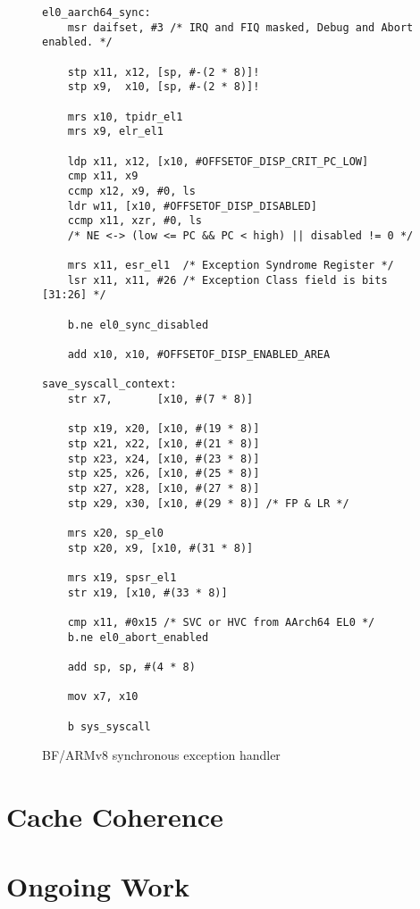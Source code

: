 \documentclass[a4paper,twoside]{report}
\begin{document}
\begin{figure}
\begin{lstlisting}
el0_aarch64_sync:
    msr daifset, #3 /* IRQ and FIQ masked, Debug and Abort enabled. */

    stp x11, x12, [sp, #-(2 * 8)]!
    stp x9,  x10, [sp, #-(2 * 8)]!

    mrs x10, tpidr_el1
    mrs x9, elr_el1

    ldp x11, x12, [x10, #OFFSETOF_DISP_CRIT_PC_LOW]
    cmp x11, x9
    ccmp x12, x9, #0, ls
    ldr w11, [x10, #OFFSETOF_DISP_DISABLED]
    ccmp x11, xzr, #0, ls
    /* NE <-> (low <= PC && PC < high) || disabled != 0 */

    mrs x11, esr_el1  /* Exception Syndrome Register */
    lsr x11, x11, #26 /* Exception Class field is bits [31:26] */

    b.ne el0_sync_disabled

    add x10, x10, #OFFSETOF_DISP_ENABLED_AREA

save_syscall_context:
    str x7,       [x10, #(7 * 8)]

    stp x19, x20, [x10, #(19 * 8)]
    stp x21, x22, [x10, #(21 * 8)]
    stp x23, x24, [x10, #(23 * 8)]
    stp x25, x26, [x10, #(25 * 8)]
    stp x27, x28, [x10, #(27 * 8)]
    stp x29, x30, [x10, #(29 * 8)] /* FP & LR */

    mrs x20, sp_el0
    stp x20, x9, [x10, #(31 * 8)]

    mrs x19, spsr_el1
    str x19, [x10, #(33 * 8)]

    cmp x11, #0x15 /* SVC or HVC from AArch64 EL0 */
    b.ne el0_abort_enabled

    add sp, sp, #(4 * 8)

    mov x7, x10

    b sys_syscall
\end{lstlisting}
\caption{BF/ARMv8 synchronous exception handler}
\label{f:sync_el0}
\end{figure}

\section{Cache Coherence}

\section{Ongoing Work}



\end{document}
